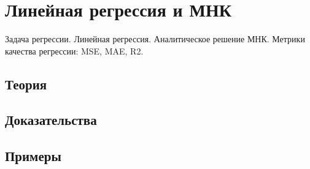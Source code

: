 
\section{Линейная регрессия и МНК}
\label{sec:1.4.02-linear-regression-ols}

\begin{ticket}
Задача регрессии. Линейная регрессия. Аналитическое решение МНК. Метрики качества регрессии: MSE, MAE, R2.
\end{ticket}

\subsection*{Теория}

\subsection*{Доказательства}

\subsection*{Примеры}
